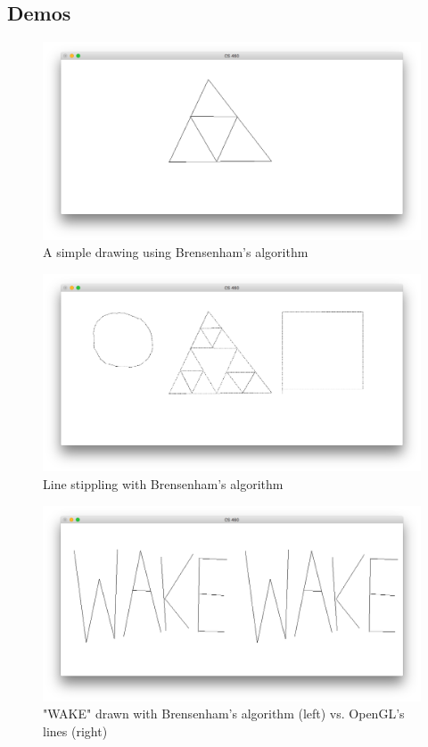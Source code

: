 \documentclass{article}
\begin{document}
\subsection{Demos}
\label{sec:orgheadline4}
\begin{figure}[htb]
\centering
\includegraphics[width=.9\linewidth]{./img/a1_bren_basic.png}
\caption{A simple drawing using Brensenham's algorithm}
\end{figure}
\begin{figure}[htb]
\centering
\includegraphics[width=.9\linewidth]{./img/a1_bren_stipple.png}
\caption{Line stippling with Brensenham's algorithm}
\end{figure}
\begin{figure}[htb]
\centering
\includegraphics[width=.9\linewidth]{./img/a1_wake.png}
\caption{"WAKE" drawn with Brensenham's algorithm (left) vs. OpenGL's lines (right)}
\end{figure}
\end{document}
